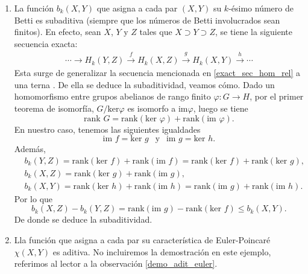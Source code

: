 \begin{example}
\label{betti_subad}
    \hfill
    \begin{enumerate}[label=(\roman*)]
        \item La función $b_k(X,Y)$ que asigna a cada par $(X,Y)$ su $k$-ésimo número de Betti es subaditiva (siempre que los números de Betti involucrados sean finitos). En efecto, sean $X$, $Y$ y $Z$ tales que $X\supset Y\supset Z$, se tiene la siguiente secuencia exacta:
        \begin{align*}
            \cdots \longrightarrow H_k(Y,Z) \overset{f}{\longrightarrow} H_k(X,Z) \overset{g}{\longrightarrow} H_k(X,Y) \overset{h}{\longrightarrow} \cdots
        \end{align*}
        Esta surge de generalizar la secuencia mencionada en \ref{exact_sec_hom_rel} a una terna \cite[p.~118]{hatcher2002}. De ella se deduce la subaditividad, veamos cómo. Dado un homomorfismo entre grupos abelianos de rango finito $\varphi: G\to H$, por el primer teorema de isomorfía, $G/\text{ker}\varphi$ es isomorfo a $\text{im} \varphi$, luego se tiene
        \begin{equation*}
            \text{rank } G = \text{rank}(\text{ker } \varphi) + \text{rank}(\text{im } \varphi).
        \end{equation*}
        En nuestro caso, tenemos las siguientes igualdades
        \begin{equation*}
            \text{im } f = \text{ker } g ~~\text{ y }~~ \text{im } g = \text{ker } h.
        \end{equation*}
        Además,
        \begin{align*}
            &b_k(Y,Z) = \text{rank}(\text{ker } f) + \text{rank}(\text{im } f) = \text{rank}(\text{ker } f) + \text{rank}(\text{ker } g),\\
            &b_k(X,Z) = \text{rank}(\text{ker } g) + \text{rank}(\text{im } g),\\
            &b_k(X,Y) = \text{rank}(\text{ker } h) + \text{rank}(\text{im } h) = \text{rank}(\text{im } g) + \text{rank}(\text{im } h). 
        \end{align*}
        Por lo que
        \begin{equation*}
            b_k(X,Z) - b_k(Y,Z) = \text{rank}(\text{im } g) - \text{rank}(\text{ker } f) \le b_k(X,Y).
        \end{equation*}
        De donde se deduce la subaditividad.
        \item Lla función que asigna a cada par su característica de Euler-Poincaré $\chi (X,Y)$ es aditiva. No incluiremos la demostración en este ejemplo, referimos al lector a la observación \ref{demo_adit_euler}.
    \end{enumerate}
\end{example}

